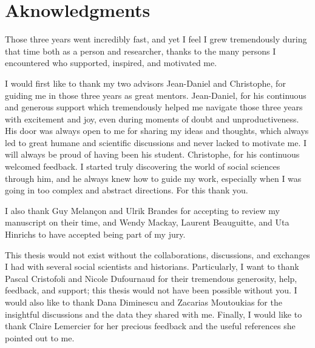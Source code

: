 \chapter*{Aknowledgments}

Those three years went incredibly fast, and yet I feel I grew tremendously during that time both as a person and researcher, thanks to the many persons I encountered  who supported, inspired, and motivated me.

I would first like to thank my two advisors Jean-Daniel and Christophe, for guiding me in those three years as great mentors.
Jean-Daniel, for his continuous and generous support which tremendously helped me navigate those three years with excitement and joy, even during moments of doubt and unproductiveness.
His door was always open to me for sharing my ideas and thoughts, which always led to great humane and scientific discussions and never lacked to motivate me.
I will always be proud of having been his student.
Christophe, for his continuous welcomed feedback.
I started truly discovering the world of social sciences through him, and he always knew how to guide my work, especially when I was going in too complex and abstract directions. For this thank you.

I also thank Guy Melançon and Ulrik Brandes for accepting to review my manuscript on their time, and Wendy Mackay, Laurent Beauguitte, and Uta Hinrichs to have accepted being part of my jury.

This thesis would not exist without the collaborations, discussions, and exchanges I had with several social scientists and historians.
Particularly, I want to thank Pascal Cristofoli and Nicole Dufournaud for their tremendous generosity, help, feedback, and support; this thesis would not have been possible without you.
I would also like to thank Dana Diminescu and Zacarias Moutoukias for the insightful discussions and the data they shared with me.
Finally, I would like to thank Claire Lemercier for her precious feedback and the useful references she pointed out to me.


